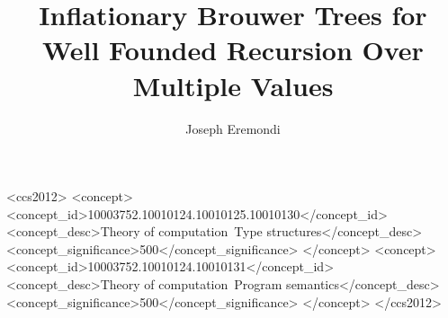 \documentclass[dvipsnames,sigplan,10pt,anonymous,review]{acmart}\settopmatter{printfolios=true,printccs=false,printacmref=false}
\begin{document}
\title{Inflationary Brouwer Trees for Well Founded Recursion Over Multiple Values}


  \author{Joseph Eremondi}





\renewcommand{\shortauthors}{Joseph Eremondi, Ronald Garcia, and \'Eric Tanter}




\begin{abstract}
  
\end{abstract}

\begin{CCSXML}
<ccs2012>
<concept>
<concept_id>10003752.10010124.10010125.10010130</concept_id>
<concept_desc>Theory of computation~Type structures</concept_desc>
<concept_significance>500</concept_significance>
</concept>
<concept>
<concept_id>10003752.10010124.10010131</concept_id>
<concept_desc>Theory of computation~Program semantics</concept_desc>
<concept_significance>500</concept_significance>
</concept>
</ccs2012>
\end{CCSXML}
\end{document}
